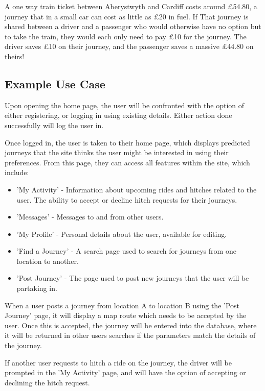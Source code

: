 A one way train ticket between Aberystwyth and Cardiff costs around \pounds 54.80\cite{trainline_aber_cardiff_price}, a journey that in a small car can cost as little as \pounds 20 in fuel. If That journey is shared between a driver and a passenger who would otherwise have no option but to take the train, they would each only need to pay \pounds 10 for the journey. The driver saves \pounds 10 on their journey, and the passenger saves a massive \pounds 44.80 on theirs!


\subsection{Example Use Case}
	Upon opening the home page, the user will be confronted with the option of either registering, or logging in using existing details. Either action done successfully will log the user in.
	
	Once logged in, the user is taken to their home page, which displays predicted journeys that the site thinks the user might be interested in using their preferences. From this page, they can access all features within the site, which include:
	\begin{itemize}
		\item 'My Activity' - Information about upcoming rides and hitches related to the user. The ability to accept or decline hitch requests for their journeys.
		\item 'Messages' - Messages to and from other users.
		\item 'My Profile' - Personal details about the user, available for editing.
		\item 'Find a Journey' - A search page used to search for journeys from one location to another.
		\item 'Post Journey' - The page used to post new journeys that the user will be partaking in.		
	\end{itemize}
	
	When a user posts a journey from location A to location B using the 'Post Journey' page, it will display a map route which needs to be accepted by the user. Once this is accepted, the journey will be entered into the database, where it will be returned in other users searches if the parameters match the details of the journey.
	
	If another user requests to hitch a ride on the journey, the driver will be prompted in the 'My Activity' page, and will have the option of accepting or declining the hitch request. 
	
